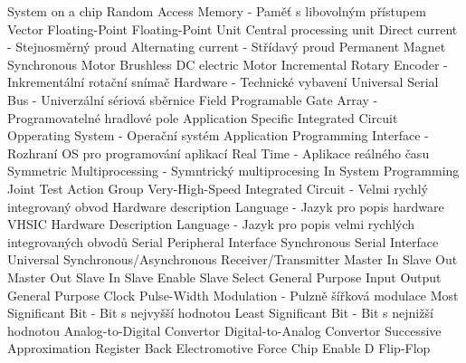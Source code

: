  {System on a chip}
 {Random Access Memory - Paměť s libovolným přístupem}
 {Vector Floating-Point}
 {Floating-Point Unit}
 {Central processing unit}
 {Direct current - Stejnosměrný proud}
 {Alternating current - Střídavý proud}
 {Permanent Magnet Synchronous Motor}
 {Brushless DC electric Motor}
 {Incremental Rotary Encoder - Inkrementální rotační snímač}
 {Hardware - Technické vybavení}
 {Universal Serial Bus - Univerzální sériová sběrnice}
 {Field Programable Gate Array - Programovatelné hradlové pole}
 {Application Specific Integrated Circuit}
 {Opperating System - Operační systém}
 {Application Programming Interface - Rozhraní OS pro programování aplikací}
 {Real Time - Aplikace reálného času}
 {Symmetric Multiprocessing - Symntrický multiprocesing}
 {In System Programming}
 {Joint Test Action Group}
 {Very-High-Speed Integrated Circuit - Velmi rychlý integrovaný obvod}
 {Hardware description Language - Jazyk pro popis hardware}
 {VHSIC Hardware Description Language - Jazyk pro popis velmi rychlých integrovaných obvodů}
 {Serial Peripheral Interface}
 {Synchronous Serial Interface}
 {Universal Synchronous/Asynchronous Receiver/Transmitter}
 {Master In Slave Out}
 {Master Out Slave In}
 {Slave Enable}
 {Slave Select}
 {General Purpose Input Output}
 {General Purpose Clock}
 {Pulse-Width Modulation - Pulzně šířková modulace}
 {Most Significant Bit - Bit s nejvyšší hodnotou}
 {Least Significant Bit - Bit s nejnižší hodnotou}
 {Analog-to-Digital Convertor}
 {Digital-to-Analog Convertor}
 {Successive Approximation Register}
 {Back Electromotive Force}
 {Chip Enable}
 {D Flip-Flop}
